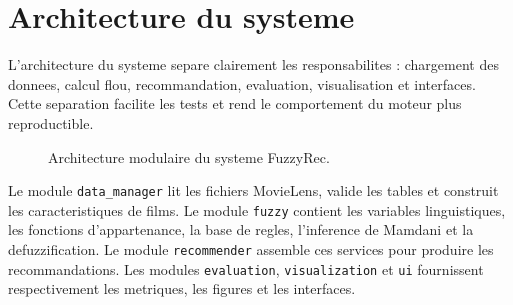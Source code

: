 \section{Architecture du systeme}

L'architecture du systeme separe clairement les responsabilites : chargement des donnees, calcul flou, recommandation, evaluation, visualisation et interfaces. Cette separation facilite les tests et rend le comportement du moteur plus reproductible.

\begin{figure}[H]
\centering
{}
\caption{Architecture modulaire du systeme FuzzyRec.}
\label{fig:architecture}
\end{figure}

Le module \texttt{data\_manager} lit les fichiers MovieLens, valide les tables et construit les caracteristiques de films. Le module \texttt{fuzzy} contient les variables linguistiques, les fonctions d'appartenance, la base de regles, l'inference de Mamdani et la defuzzification. Le module \texttt{recommender} assemble ces services pour produire les recommandations. Les modules \texttt{evaluation}, \texttt{visualization} et \texttt{ui} fournissent respectivement les metriques, les figures et les interfaces.

